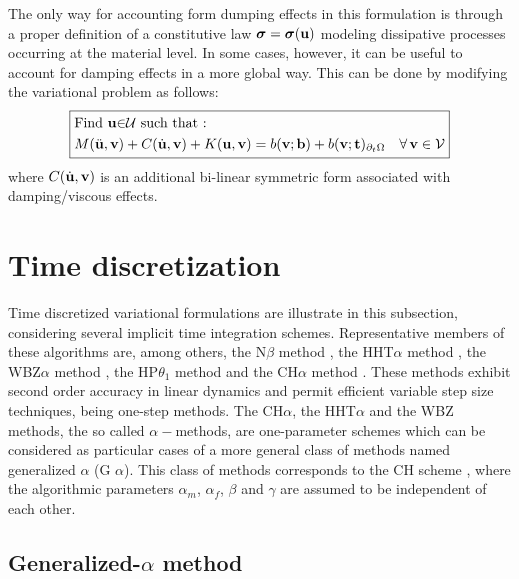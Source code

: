 \documentclass{report}
\DeclareRobustCommand{\greektext}{%
  \fontencoding{LGR}\selectfont\def\encodingdefault{LGR}}
\DeclareRobustCommand{\textgreek}[1]{\leavevmode{\greektext #1}}
\newcommand{\bb}{\textbf{b}}
\newcommand{\bu}{\textbf{u}}
\newcommand{\bv}{\textbf{v}}
\newcommand{\bt}{\boldsymbol t}
\def\bsigma{\mbox{\boldmath${\sigma}$}}
\def\bb{{\bf{b}}}
\def\bt{{\bf t}}
\def\bu{{\bf{u}}}
\def\bv{{\bf{v}}}
\begin{document}
The only way for accounting form dumping effects in this formulation
is through a proper definition of a constitutive law $\bsigma=\bsigma(\bu)$
modeling dissipative processes occurring at the material level. In
some cases, however, it can be useful to account for damping effects
in a more global way. This can be done by modifying the variational
problem as follows:
\begin{equation}
\boxed{\begin{aligned} & \text{Find \ensuremath{\bu}\ensuremath{\in}\ensuremath{\mathcal{U}} such that : }\\
 & M(\ddot{\bu},\bv)+C(\dot{\bu},\bv)+K(\bu,\bv)=b(\bv;\bb)+b(\bv;\bt)_{\partial_{t}\Omega}\quad\forall\,\bv\in\mathcal{V}
\end{aligned}
}
\end{equation}
where $C(\dot{\bu},\bv)$ is an additional bi-linear symmetric form
associated with damping/viscous effects.

\section{Time discretization}

Time discretized variational formulations are illustrate in this subsection,
considering several implicit time integration schemes. Representative
members of these algorithms are, among others, the N\textminus $\beta$
method \cite{newmark1959method}, the HHT\textminus $\alpha$ method \cite{hilber1977improved}, the WBZ\textminus $\alpha$ method \cite{wood1980alpha}, the HP\textminus $\theta_{1}$ method \cite{hoff1988development} and the CH\textminus $\alpha$ method \cite{chung1993time}. These methods exhibit second order accuracy
in linear dynamics and permit efficient variable step size techniques,
being one-step methods. The CH\textminus $\alpha$, the HHT\textminus $\alpha$
and the WBZ\textminus \textgreek{a} methods, the so called $\alpha-$methods,
are one-parameter schemes which can be considered as particular cases
of a more general class of methods named generalized \textminus{}
$\alpha$ (G \textminus{} $\alpha$). This class
of methods corresponds to the CH\textminus \textgreek{a} scheme \cite{chung1993time}, where the algorithmic parameters $\alpha_{m}$,
$\alpha_{f}$, $\beta$ and $\gamma$ are assumed to be independent
of each other.

\subsection{Generalized-\texorpdfstring{$\alpha$}{a} method}
\end{document}
